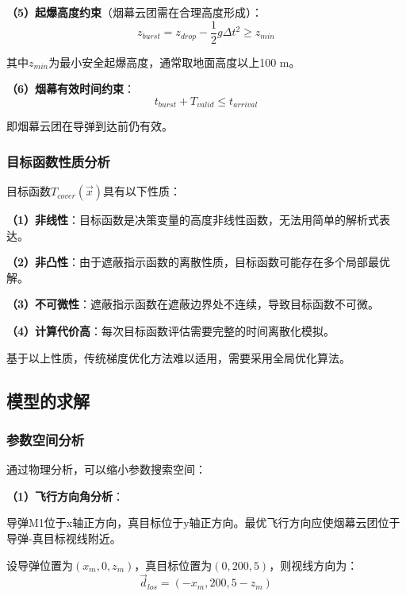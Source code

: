 \documentclass[12pt,a4paper]{article}
\begin{document}
\indent \textbf{（5）起爆高度约束}（烟幕云团需在合理高度形成）：
\begin{equation}
z_{burst} = z_{drop} - \frac{1}{2}g\Delta t^2 \geq z_{min}
\end{equation}

\indent 其中$z_{min}$为最小安全起爆高度，通常取地面高度以上100 m。

\indent \textbf{（6）烟幕有效时间约束}：
\begin{equation}
t_{burst} + T_{valid} \leq t_{arrival}
\end{equation}

\indent 即烟幕云团在导弹到达前仍有效。

\subsubsection{目标函数性质分析}

\indent 目标函数$T_{cover}(\vec{x})$具有以下性质：

\indent \textbf{（1）非线性}：目标函数是决策变量的高度非线性函数，无法用简单的解析式表达。

\indent \textbf{（2）非凸性}：由于遮蔽指示函数的离散性质，目标函数可能存在多个局部最优解。

\indent \textbf{（3）不可微性}：遮蔽指示函数在遮蔽边界处不连续，导致目标函数不可微。

\indent \textbf{（4）计算代价高}：每次目标函数评估需要完整的时间离散化模拟。

\indent 基于以上性质，传统梯度优化方法难以适用，需要采用全局优化算法。

\subsection{模型的求解}

\subsubsection{参数空间分析}

\indent 通过物理分析，可以缩小参数搜索空间：

\noindent\textbf{（1）飞行方向角分析}：

\indent 导弹M1位于x轴正方向，真目标位于y轴正方向。最优飞行方向应使烟幕云团位于导弹-真目标视线附近。

\indent 设导弹位置为$(x_m, 0, z_m)$，真目标位置为$(0, 200, 5)$，则视线方向为：
\begin{equation}
\vec{d}_{los} = (-x_m, 200, 5-z_m)
\end{equation}
\end{document}
